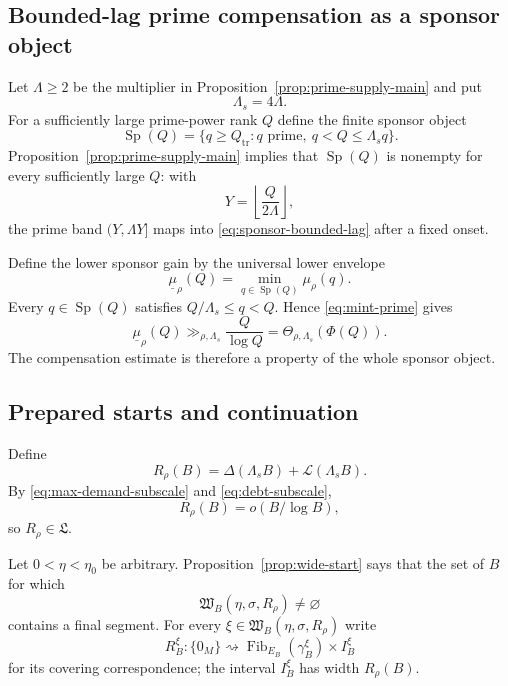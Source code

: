 \subsection{Bounded-lag prime compensation as a sponsor object}

Let $\Lambda\ge2$ be the multiplier in Proposition~\ref{prop:prime-supply-main} and put
\begin{equation}\label{eq:sponsor-lag}
\Lambda_s=4\Lambda.
\end{equation}
For a sufficiently large prime-power rank $Q$ define the finite sponsor object
\begin{equation}\label{eq:sponsor-bounded-lag}
\operatorname{Sp}(Q)=
\{q\ge Q_{\mathrm{tr}}:q\text{ prime},\ q<Q\le\Lambda_s q\}.
\end{equation}
Proposition~\ref{prop:prime-supply-main} implies that $\operatorname{Sp}(Q)$ is nonempty for every sufficiently large $Q$: with
\[
Y=\left\lfloor\frac{Q}{2\Lambda}\right\rfloor,
\]
the prime band $(Y,\Lambda Y]$ maps into \eqref{eq:sponsor-bounded-lag} after a fixed onset.

Define the lower sponsor gain by the universal lower envelope
\[
\underline\mu_\rho(Q)=
\min_{q\in\operatorname{Sp}(Q)}\mu_\rho(q).
\]
Every $q\in\operatorname{Sp}(Q)$ satisfies $Q/\Lambda_s\le q<Q$.  Hence \eqref{eq:mint-prime} gives
\begin{equation}\label{eq:sponsor-mint}
\underline\mu_\rho(Q)
\gg_{\rho,\Lambda_s}\frac Q{\log Q}
=\Theta_{\rho,\Lambda_s}(\Phi(Q)).
\end{equation}
The compensation estimate is therefore a property of the whole sponsor object.

\subsection{Prepared starts and continuation}

Define
\begin{equation}\label{eq:startup-request}
R_\rho(B)=\Delta(\Lambda_sB)+\mathcal L(\Lambda_sB).
\end{equation}
By \eqref{eq:max-demand-subscale} and \eqref{eq:debt-subscale},
\begin{equation}\label{eq:startup-subscale-scalar}
R_\rho(B)=o(B/\log B),
\end{equation}
so $R_\rho\in\mathfrak L$.

Let $0<\eta<\eta_0$ be arbitrary.  Proposition~\ref{prop:wide-start} says that the set of $B$ for which
\[
\mathfrak W_B(\eta,\sigma,R_\rho)\ne\varnothing
\]
contains a final segment.  For every $\xi\in\mathfrak W_B(\eta,\sigma,R_\rho)$ write
\[
R_B^\xi:\{0_M\}\rightsquigarrow
\operatorname{Fib}_{E_B}(\gamma_B^\xi)\times I_B^\xi
\]
for its covering correspondence; the interval $I_B^\xi$ has width $R_\rho(B)$.

